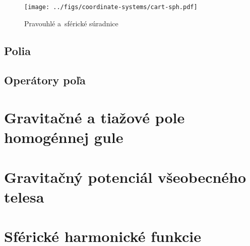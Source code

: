 \documentclass[a4paper, 12pt]{book}
\begin{document}
\begin{figure}[bt]
\centering
\texttt{[image: ../figs/coordinate-systems/cart-sph.pdf]}
\caption{Pravouhlé a~sférické súradnice}
\end{figure}


\section{Polia}

\section{Operátory poľa}








\chapter{Gravitačné a tiažové pole homogénnej gule}







\chapter{Gravitačný potenciál všeobecného telesa}








\chapter{Sférické harmonické funkcie}

\end{document}
